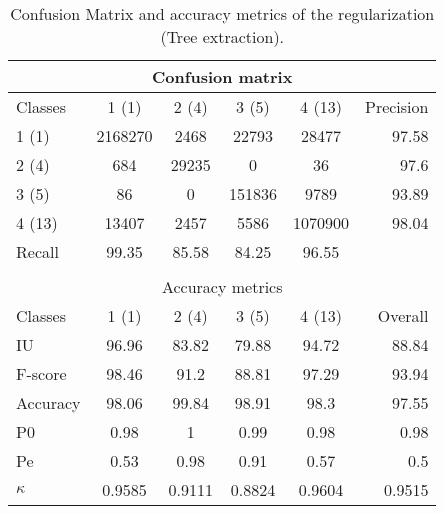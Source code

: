 \begin{table}[H]
\begin{center}
\footnotesize
\begin{tabular}{|l|c|c|c|c|r|}
\hline
\multicolumn{6}{|c|}{Confusion matrix} \\
\hline
 Classes & 1 (1) & 2 (4) & 3 (5) & 4 (13) & Precision \\
\hline
1 (1) & 2168270 & 2468 & 22793 & 28477 & 97.58 \\
\hline
2 (4) & 684 & 29235 & 0 & 36 & 97.6 \\
\hline
3 (5) & 86 & 0 & 151836 & 9789 & 93.89 \\
\hline
4 (13) & 13407 & 2457 & 5586 & 1070900 & 98.04 \\
\hline
Recall & 99.35 & 85.58 & 84.25 & 96.55 &  \\
\hline
\multicolumn{6}{c}{ } \\
\hline
\multicolumn{6}{|c|}{Accuracy metrics} \\
\hline
 Classes & 1 (1) & 2 (4) & 3 (5) & 4 (13) & Overall \\
\hline
IU & 96.96 & 83.82 & 79.88 & 94.72 & 88.84 \\
\hline
F-score & 98.46 & 91.2 & 88.81 & 97.29 & 93.94 \\
\hline
Accuracy & 98.06 & 99.84 & 98.91 & 98.3 & 97.55 \\
\hline
P0 & 0.98 & 1 & 0.99 & 0.98 & 0.98 \\
\hline
Pe & 0.53 & 0.98 & 0.91 & 0.57 & 0.5 \\
\hline
$\kappa$ & 0.9585 & 0.9111 & 0.8824 & 0.9604 & 0.9515 \\
\hline
\end{tabular}
\caption{Confusion Matrix and accuracy metrics of the regularization (Tree extraction).}
\label{table:}
\end{center}
\end{table}
